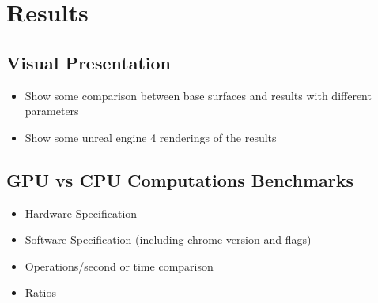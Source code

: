 \chapter{Results} \label{chap:results}

  \section {Visual Presentation} %
  
    \begin{itemize}
    	\item Show some comparison between base surfaces and results with different parameters
    	\item Show some unreal engine 4 renderings of the results
    \end{itemize}
  
  \section {GPU vs CPU Computations Benchmarks}
  
    \begin{itemize}
    	\item Hardware Specification
    	\item Software Specification (including chrome version and flags)
    	\item Operations/second or time comparison
    	\item Ratios
    \end{itemize}